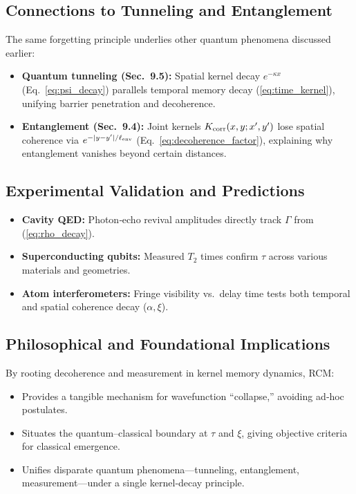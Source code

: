 \subsection{Connections to Tunneling and Entanglement}

The same forgetting principle underlies other quantum phenomena discussed earlier:

\begin{itemize}
  \item \textbf{Quantum tunneling (Sec.~9.5):} Spatial kernel decay $e^{-\kappa x}$ (Eq.~\eqref{eq:psi_decay}) parallels temporal memory decay (\ref{eq:time_kernel}), unifying barrier penetration and decoherence.
  \item \textbf{Entanglement (Sec.~9.4):} Joint kernels $K_{\rm corr}(x,y;x',y')$ lose spatial coherence via $e^{-|y-y'|/\ell_{\rm env}}$ (Eq.~\eqref{eq:decoherence_factor}), explaining why entanglement vanishes beyond certain distances.
\end{itemize}

\subsection{Experimental Validation and Predictions}

\begin{itemize}
  \item \textbf{Cavity QED:} Photon‐echo revival amplitudes directly track $\Gamma$ from (\ref{eq:rho_decay}).  
  \item \textbf{Superconducting qubits:} Measured $T_2$ times confirm $\tau$ across various materials and geometries.  
  \item \textbf{Atom interferometers:} Fringe visibility vs.\ delay time tests both temporal and spatial coherence decay ($\alpha,\xi$).
\end{itemize}

\subsection{Philosophical and Foundational Implications}

By rooting decoherence and measurement in kernel memory dynamics, RCM:

\begin{itemize}
  \item Provides a tangible mechanism for wavefunction “collapse,” avoiding ad‐hoc postulates.
  \item Situates the quantum–classical boundary at $\tau$ and $\xi$, giving objective criteria for classical emergence.
  \item Unifies disparate quantum phenomena—tunneling, entanglement, measurement—under a single kernel‐decay principle.
\end{itemize}

